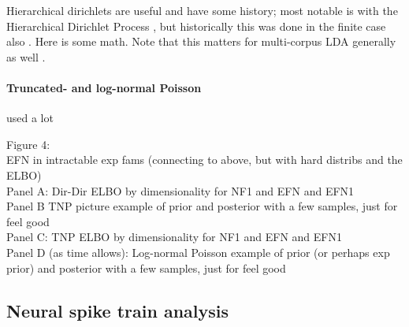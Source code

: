 \documentclass{article}
\begin{document}
Hierarchical dirichlets are useful and have some history; most notable is with the  Hierarchical Dirichlet Process \cite{teh2006hdp}, but historically this was done in the finite case also \cite{mackay1995hierarchical}.  Here is some math.    Note that this matters for multi-corpus LDA generally as well \cite{blei2003latent, pritchard2000inference}.


\paragraph{Truncated- and log-normal Poisson}

used a lot \cite{gao2016linear}\cite{adams2009tractable}\cite{cunningham2008fast,cunningham2008inferring}

Figure 4: \\
EFN in intractable exp fams (connecting to above, but with hard distribs and the ELBO) \\
Panel A: Dir-Dir ELBO by dimensionality for NF1 and EFN and EFN1\\
Panel B TNP picture example of prior and posterior with a few samples, just for feel good  \\
Panel C: TNP ELBO by dimensionality for NF1 and EFN and EFN1 \\
Panel D (as time allows): Log-normal Poisson example of prior (or perhaps exp prior) and posterior with a few samples, just for feel good  \\

\subsection{Neural spike train analysis}
\end{document}
